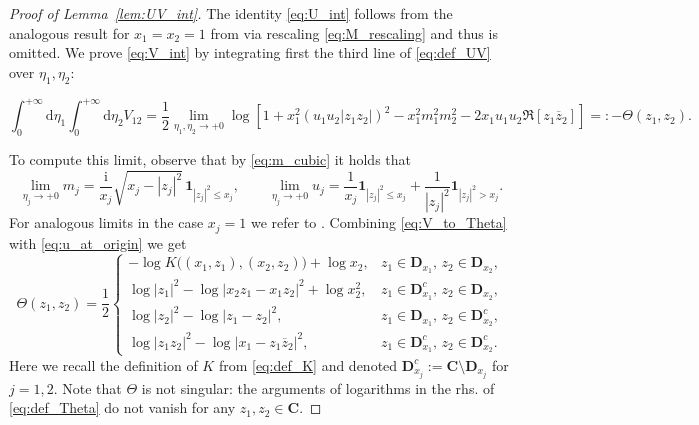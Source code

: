 \documentclass[10pt]{amsart}
\numberwithin{equation}{section}
\newcommand{\dif}{\mathrm{d}}
\newcommand{\C}{\mathbf{C}}
\newcommand{\DD}{\mathbf{D}}
\newcommand{\ii}{\mathrm{i}}
\begin{document}
\begin{proof}[Proof of Lemma~\ref{lem:UV_int}] The identity \eqref{eq:U_int} follows from the analogous result for $x_1=x_2=1$ from \cite[Lemma~4.10]{macroCLT_complex} via rescaling \eqref{eq:M_rescaling} and thus is omitted. We prove \eqref{eq:V_int} by integrating first the third line of \eqref{eq:def_UV} over $\eta_1,\eta_2$:
\begin{small}
\begin{equation}
\int_0^{+\infty}\!\!\!\dif\eta_1\int_0^{+\infty}\!\!\!\dif\eta_2 V_{12} = \frac{1}{2}\lim_{\eta_1,\eta_2\to +0} \log \left[1+x_1^2\left(u_1u_2|z_1z_2|\right)^2 -x_1^2m_1^2m_2^2 -2x_1u_1u_2\Re [z_1\overline{z}_2]\right]=:-\Theta(z_1,z_2).
\label{eq:V_to_Theta}
\end{equation}
\end{small}
To compute this limit, observe that by \eqref{eq:m_cubic} it holds that
\begin{equation}
\lim_{\eta_j\to+0} m_j = \frac{\ii}{x_j}\sqrt{x_j-|z_j|^2}\,\bm{1}_{|z_j|^2 \le x_j},\qquad \lim_{\eta_j\to +0}u_j =\frac{1}{x_j}\bm{1}_{|z_j|^2\le x_j} + \frac{1}{|z_j|^2}\bm{1}_{|z_j|^2> x_j}.
\label{eq:u_at_origin}
\end{equation}
For analogous limits in the case $x_j=1$ we refer to \cite[Sec.4.3.2-4.3.3]{macroCLT_complex}. Combining \eqref{eq:V_to_Theta} with \eqref{eq:u_at_origin} we get
\begin{equation}
\Theta(z_1,z_2)=\frac{1}{2}
\begin{cases}
-\log K\big((x_1,z_1),(x_2,z_2)\big) + \log x_2,& z_1\in\DD_{x_1},\, z_2\in \DD_{x_2},\\
\log |z_1|^2 -\log |x_2z_1-x_1z_2|^2+\log x_2^2,& z_1\in\DD_{x_1}^c,\, z_2\in \DD_{x_2},\\
\log |z_2|^2 -\log|z_1-z_2|^2,& z_1\in\DD_{x_1},\, z_2\in \DD_{x_2}^c,\\
\log |z_1z_2|^2 -\log |x_1-z_1\overline{z}_2|^2,& z_1\in\DD_{x_1}^c,\, z_2\in \DD_{x_2}^c.
\end{cases}
\label{eq:def_Theta}
\end{equation}
Here we recall the definition of $K$ from \eqref{eq:def_K} and denoted $\DD_{x_j}^c:=\C\setminus\DD_{x_j}$ for $j=1,2$. Note that $\Theta$ is not singular: the arguments of logarithms in the rhs. of \eqref{eq:def_Theta} do not vanish for any $z_1,z_2\in\C$.


\end{proof}
\end{document}
